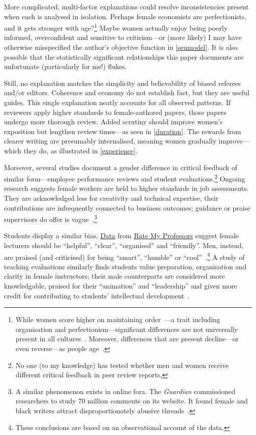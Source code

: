 More complicated, multi-factor explanations could resolve inconsistencies present when each is analysed in isolation. Perhaps female economists are perfectionists, and it gets stronger with age?\footnote{While women score higher on maintaining order~\citep{Feingold1994}---a trait including organisation and perfectionism---significant differences are not universally present in all cultures~\citep{Costa2001}. Moreover, differences that are present decline---or even reverse---as people age~\citep{Weisberg2011}.} Maybe women actually enjoy being poorly informed, overconfident and sensitive to criticism---or (more likely) I may have otherwise misspecified the author's objective function in \autoref{seumodel}. It is also possible that the statistically significant relationships this paper documents are unfortunate (particularly for me!) flukes.

Still, no explanation matches the simplicity and believability of biased referees and\slash or editors. Coherence and economy do not establish fact, but they are useful guides. This single explanation neatly accounts for all observed patterns. If reviewers apply higher standards to female-authored papers, those papers undergo more thorough review. Added scrutiny should improve women's exposition but lengthen review times---as seen in \autoref{duration}. The rewards from clearer writing are presumably internalised, meaning women gradually improve---which they do, as illustrated in \autoref{experience}.

Moreover, several studies document a gender difference in critical feedback of similar form---employee performance reviews and student evaluations.\footnote{No one (to my knowledge) has tested whether men and women receive different critical feedback in peer review reports,} Ongoing research suggests female workers are held to higher standards in job assessments. They are acknowledged less for creativity and technical expertise, their contributions are infrequently connected to business outcomes; guidance or praise supervisors do offer is vague~\citep{Correll2016}.\footnote{A similar phenomenon exists in online fora. The \emph{Guardian} commissioned researchers to study 70 million comments on its website. It found female and black writers attract disproportionately abusive threads~\citep{Gardiner2016}.}

Students display a similar bias. \href{http://benschmidt.org/profGender/}{Data} from \href{http://www.ratemyprofessors.com/}{Rate My Professors} suggest female lecturers should be ``helpful'', ``clear'', ``organised'' and ``friendly''. Men, instead, are praised (and criticised) for being ``smart'', ``humble'' or ``cool''~\citep{Schmidt2015}.\footnote{These conclusions are based on an observational account of the data.} A study of teaching evaluations similarly finds students value preparation, organisation and clarity in female instructors; their male counterparts are considered more knowledgable, praised for their ``animation'' and ``leadership'' and given more credit for contributing to students' intellectual development~\citep{Boring2017}.

